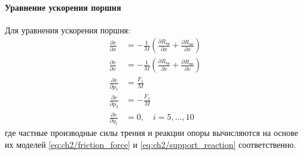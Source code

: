 \paragraph{Уравнение ускорения поршня}
Для уравнения ускорения поршня:
\begin{equation}
\label{eq:ch2/jacobian_acceleration}
    \begin{aligned}
        \frac{\partial \dot{v}}{\partial x}   & = -\frac{1}{M}\left(\frac{\partial R_\text{тр}}{\partial x} + \frac{\partial R_\text{оп}}{\partial x}\right) \\
        \frac{\partial \dot{v}}{\partial v}   & = -\frac{1}{M}\left(\frac{\partial R_\text{тр}}{\partial v} + \frac{\partial R_\text{оп}}{\partial v}\right) \\
        \frac{\partial \dot{v}}{\partial p_1} & = \frac{F_1}{M}                                                                                              \\
        \frac{\partial \dot{v}}{\partial p_2} & = -\frac{F_2}{M}                                                                                             \\
        \frac{\partial \dot{v}}{\partial y_i} & = 0, \quad i = 5, \ldots, 10
    \end{aligned}
\end{equation}
где частные производные силы трения и реакции опоры вычисляются на основе их моделей
\eqref{eq:ch2/friction_force} и \eqref{eq:ch2/support_reaction} соответственно.

